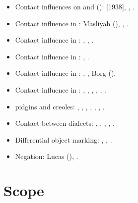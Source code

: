 \documentclass[output=paper]{langsci/langscibook}
\begin{document}
\begin{itemize}[noitemsep,leftmargin=11pt]
\item[\adfhalfrightarrowhead]Contact influences on  and   (): \citet{Jeffrey2007} [1938], \citet{Blau1969}, \citet{Hebbo1984}.

\item[\adfhalfrightarrowhead]Contact influence in  : Masliyah (\citeyear{Masliyah1996,Masliyah1997}), \citet{MatrasShabibi2007}, \citet{ElZarkaZiagos2019}.

\item[\adfhalfrightarrowhead]Contact influence in  : \citet{Jastrow2005}, \citet{Ratcliffe2005}, \citet{Ingham2011afg}.

\item[\adfhalfrightarrowhead]Contact influence in  : \citet{Barbot1961}, \citet{Neishtadt2015}.

\item[\adfhalfrightarrowhead]Contact influence in  : \citet{Newton1964}, \citet{Tsiapera1964}, Borg (\citeyear{Borg1997CMA,Borg2004}).

\item[\adfhalfrightarrowhead]Contact influence in : \citet{colin1957}, \citet{Aquilina1958}, \citet{krier1976},  \citet{mifsudloanverbs}, \citet{brincat2011}, \citet{Souag2018berber}.

\item[\adfhalfrightarrowhead] pidgins and creoles: \citet{Owens1985}, \citet{Miller1993}, \citet{Luffin2014}, \citet{Manfredi2014relex}, \citet{Avram2017article}, \citet{Bizri2018}, \citet{Owens2018}.

\item[\adfhalfrightarrowhead]Contact between  dialects:  \citet{Al-Wer2007}, \citet{Gibson2002}, \citet{Miller2007}, \citet{CotterHoresh2015}, \citet{Leddy-Cecere2018}.

\item[\adfhalfrightarrowhead]Differential object marking: \citet{Coghill2014}, \citet{dohla2016}, \citet{Souag2017clitic}.

\item[\adfhalfrightarrowhead]Negation: Lucas (\citeyear{Lucas2007,Lucas2012}), \citet{LucasLash2010}.

\end{itemize}

\section{Scope}\label{introscope}
\end{document}
